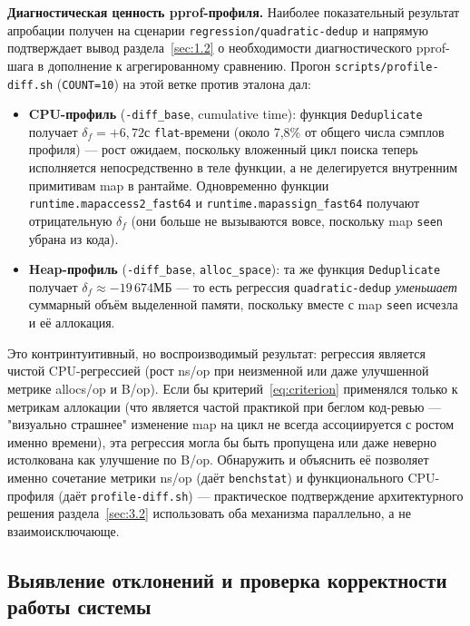 \textbf{Диагностическая ценность pprof-профиля.} Наиболее показательный
результат апробации получен на сценарии \texttt{regression/\allowbreak quadratic-dedup}
и напрямую подтверждает вывод раздела~\ref{sec:1.2} о необходимости
диагностического pprof-шага в дополнение к агрегированному сравнению.
Прогон \texttt{scripts/\allowbreak profile-diff.sh} (\texttt{COUNT=10}) на этой ветке
против эталона дал:

\begin{itemize}
\item \textbf{CPU-профиль} (\texttt{-diff\_base}, cumulative time):
функция \texttt{Deduplicate} получает $\delta_f = {+6{,}72}$с
\texttt{flat}-времени (около 7,8\% от общего числа сэмплов профиля) — рост
ожидаем, поскольку вложенный цикл поиска теперь исполняется непосредственно
в теле функции, а не делегируется внутренним примитивам map в рантайме.
Одновременно функции \texttt{runtime.mapaccess2\_fast64} и
\texttt{runtime.mapassign\_fast64} получают отрицательную $\delta_f$
(они больше не вызываются вовсе, поскольку map \texttt{seen} убрана из
кода).
\item \textbf{Heap-профиль} (\texttt{-diff\_base}, \texttt{alloc\_space}):
та же функция \texttt{Deduplicate} получает $\delta_f \approx
{-19\,674}$МБ — то есть регрессия \texttt{quadratic-dedup}
\emph{уменьшает} суммарный объём выделенной памяти, поскольку вместе с
map \texttt{seen} исчезла и её аллокация.
\end{itemize}

Это контринтуитивный, но воспроизводимый результат: регрессия является
чистой CPU-регрессией (рост ns/op при неизменной или даже улучшенной
метрике allocs/op и B/op). Если бы критерий~\eqref{eq:criterion}
применялся только к метрикам аллокации (что является частой практикой при
беглом код-ревью — "визуально страшнее" изменение map на цикл не всегда
ассоциируется с ростом именно времени), эта регрессия могла бы быть
пропущена или даже неверно истолкована как улучшение по B/op. Обнаружить
и объяснить её позволяет именно сочетание метрики ns/op (даёт
\texttt{benchstat}) и функционального CPU-профиля (даёт
\texttt{profile-diff.sh}) — практическое подтверждение архитектурного
решения раздела~\ref{sec:3.2} использовать оба механизма параллельно, а не
взаимоисключающе.

\subsection{Выявление отклонений и проверка корректности работы системы}
\label{sec:5.2}

